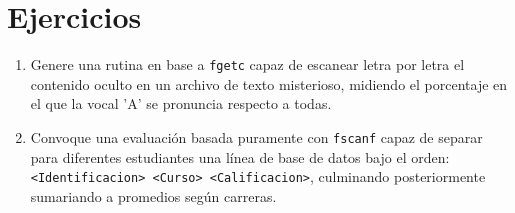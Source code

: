 \documentclass[12pt,a4paper]{article}
\begin{document}
\section{Ejercicios}
\begin{enumerate}
    \item Genere una rutina en base a \texttt{fgetc} capaz de escanear letra por letra el contenido oculto en un archivo de texto misterioso, midiendo el porcentaje en el que la vocal 'A' se pronuncia respecto a todas.
    \item Convoque una evaluación basada puramente con \texttt{fscanf} capaz de separar para diferentes estudiantes una línea de base de datos bajo el orden: \texttt{<Identificacion> <Curso> <Calificacion>}, culminando posteriormente sumariando a promedios según carreras.
\end{enumerate}
\end{document}
